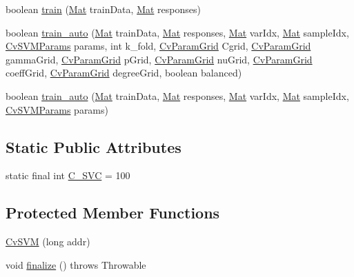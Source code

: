 \begin{DoxyCompactItemize}
\item 
boolean \mbox{\hyperlink{classorg_1_1opencv_1_1ml_1_1_cv_s_v_m_a49db7cc264b43448bee32b65aa3732b2}{train}} (\mbox{\hyperlink{classorg_1_1opencv_1_1core_1_1_mat}{Mat}} train\+Data, \mbox{\hyperlink{classorg_1_1opencv_1_1core_1_1_mat}{Mat}} responses)
\item 
boolean \mbox{\hyperlink{classorg_1_1opencv_1_1ml_1_1_cv_s_v_m_a08af9eb5976bbf6d2fdc994a9a5554d0}{train\+\_\+auto}} (\mbox{\hyperlink{classorg_1_1opencv_1_1core_1_1_mat}{Mat}} train\+Data, \mbox{\hyperlink{classorg_1_1opencv_1_1core_1_1_mat}{Mat}} responses, \mbox{\hyperlink{classorg_1_1opencv_1_1core_1_1_mat}{Mat}} var\+Idx, \mbox{\hyperlink{classorg_1_1opencv_1_1core_1_1_mat}{Mat}} sample\+Idx, \mbox{\hyperlink{classorg_1_1opencv_1_1ml_1_1_cv_s_v_m_params}{Cv\+S\+V\+M\+Params}} params, int k\+\_\+fold, \mbox{\hyperlink{classorg_1_1opencv_1_1ml_1_1_cv_param_grid}{Cv\+Param\+Grid}} Cgrid, \mbox{\hyperlink{classorg_1_1opencv_1_1ml_1_1_cv_param_grid}{Cv\+Param\+Grid}} gamma\+Grid, \mbox{\hyperlink{classorg_1_1opencv_1_1ml_1_1_cv_param_grid}{Cv\+Param\+Grid}} p\+Grid, \mbox{\hyperlink{classorg_1_1opencv_1_1ml_1_1_cv_param_grid}{Cv\+Param\+Grid}} nu\+Grid, \mbox{\hyperlink{classorg_1_1opencv_1_1ml_1_1_cv_param_grid}{Cv\+Param\+Grid}} coeff\+Grid, \mbox{\hyperlink{classorg_1_1opencv_1_1ml_1_1_cv_param_grid}{Cv\+Param\+Grid}} degree\+Grid, boolean balanced)
\item 
boolean \mbox{\hyperlink{classorg_1_1opencv_1_1ml_1_1_cv_s_v_m_a7cb09e4fa9826ead1bb11c10d9847302}{train\+\_\+auto}} (\mbox{\hyperlink{classorg_1_1opencv_1_1core_1_1_mat}{Mat}} train\+Data, \mbox{\hyperlink{classorg_1_1opencv_1_1core_1_1_mat}{Mat}} responses, \mbox{\hyperlink{classorg_1_1opencv_1_1core_1_1_mat}{Mat}} var\+Idx, \mbox{\hyperlink{classorg_1_1opencv_1_1core_1_1_mat}{Mat}} sample\+Idx, \mbox{\hyperlink{classorg_1_1opencv_1_1ml_1_1_cv_s_v_m_params}{Cv\+S\+V\+M\+Params}} params)
\end{DoxyCompactItemize}
\subsection*{Static Public Attributes}
\begin{DoxyCompactItemize}
\item 
static final int \mbox{\hyperlink{classorg_1_1opencv_1_1ml_1_1_cv_s_v_m_a8f904304af3689654b3d7de34ae54801}{C\+\_\+\+S\+VC}} = 100
\end{DoxyCompactItemize}
\subsection*{Protected Member Functions}
\begin{DoxyCompactItemize}
\item 
\mbox{\hyperlink{classorg_1_1opencv_1_1ml_1_1_cv_s_v_m_a10441681278e244e8ebfbf2ed14862c4}{Cv\+S\+VM}} (long addr)
\item 
void \mbox{\hyperlink{classorg_1_1opencv_1_1ml_1_1_cv_s_v_m_a89982bbee2873b1213d05eb1b4ca408c}{finalize}} ()  throws Throwable 
\end{DoxyCompactItemize}
